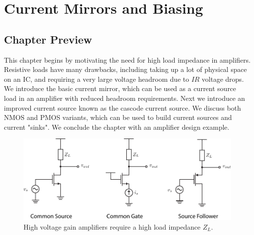 \chapter{Current Mirrors and Biasing}
\label{ch:ch13_mirrors_biasing}
\graphicspath{{./figures/figs_ch13_mirrors_biasing/}}
\section{Chapter Preview}
This chapter begins by motivating the need for high load impedance in amplifiers.  Resistive loads have many drawbacks, including taking up a lot of physical space on an IC, and requiring a very large voltage headroom due to $IR$ voltage drops.  We introduce the basic current mirror, which can be used as a current source load in an amplifier with reduced headroom requirements.  Next we introduce an improved current source known as the cascode current source.  We discuss both NMOS and PMOS variants, which can be used to build current sources and current "sinks".  We conclude the chapter with an amplifier design example.
\newpage
\begin{figure}[t]
\centering
\includegraphics[width=.85\columnwidth]{0highZload.pdf}
\caption{High voltage gain amplifiers require a high load impedance $Z_L$.}
\label{fig:0highZload.pdf}
\end{figure}
